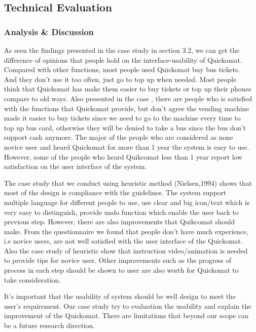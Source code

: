 \documentclass[twocolumn]{article}
\begin{document}
\subsection{Technical Evaluation}

\subsubsection{Analysis \& Discussion}
As seen the findings presented in the case study in section 3.2, we can get the difference of opinions that people hold on the interface-usability of Quickomat. Compared with other functions, most people used Quickomat buy bus tickets. And they don’t use it too often, just go to top up when needed. Most people think that Quickomat has make them easier to buy tickets or top up their phones compare to old ways. Also presented in the case , there are people who is satisfied with the functions that Quickomat provide, but don’t agree the vending machine made it easier to buy tickets since we need to go to the machine every time to top up bus card, otherwise they will be denied to take a bus since the bus don’t support cash anymore. The major of the people who are considered as none novice user and heard Quickomat for more than 1 year the system is easy to use. However, some of the people who heard Quikcomat less than 1 year report low satisfaction on the user interface of the system.

The case study that we conduct using heuristic method (Nielsen,1994) shows that most of the design is compliance with the guidelines. The system support multiple language for different people to use, use clear and big icon/text which is very easy to distinguish, provide undo function which enable the user back to previous step. However, there are also improvements that Quikcomat should make. From the questionnaire we found that people don’t have much experience, i.e novice users, are not well satisfied with the user interface of the Quickomat. Also the case study of heuristic show that instruction video/animation is needed to provide tips for novice user. Other improvements such as the progress of process in each step should be shown to user are also worth for Quickomat to take consideration.

It’s important that the usability of system should be well design to meet the user’s requirement. Our case study try to evaluation the usability and explain the improvement of the Quickomat. There are limitations that beyond our scope can be a future research direction.
\end{document}
